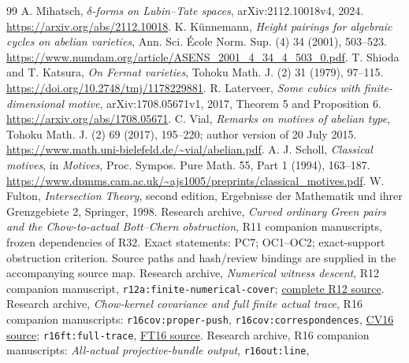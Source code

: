 \documentclass[11pt,a4paper]{article}
\theoremstyle{definition}
\theoremstyle{remark}\newtheorem{remark}[theorem]{Remark}
\numberwithin{equation}{section}
\begin{document}
\begin{thebibliography}{99}
 A. Mihatsch, \emph{$\delta$-forms on Lubin--Tate spaces},
arXiv:2112.10018v4, 2024. \url{https://arxiv.org/abs/2112.10018}.
 K. K\"unnemann, \emph{Height pairings for algebraic cycles on
abelian varieties}, Ann. Sci. \'Ecole Norm. Sup. (4) 34 (2001), 503--523.
\url{https://www.numdam.org/article/ASENS_2001_4_34_4_503_0.pdf}.
 T. Shioda and T. Katsura, \emph{On Fermat varieties},
Tohoku Math. J. (2) 31 (1979), 97--115.
\url{https://doi.org/10.2748/tmj/1178229881}.
 R. Laterveer, \emph{Some cubics with finite-dimensional
motive}, arXiv:1708.05671v1, 2017, Theorem 5 and Proposition 6.
\url{https://arxiv.org/abs/1708.05671}.
 C. Vial, \emph{Remarks on motives of abelian type},
Tohoku Math. J. (2) 69 (2017), 195--220; author version of 20 July 2015.
\url{https://www.math.uni-bielefeld.de/~vial/abelian.pdf}.
 A. J. Scholl, \emph{Classical motives}, in
\emph{Motives}, Proc. Sympos. Pure Math. 55, Part 1 (1994), 163--187.
\url{https://www.dpmms.cam.ac.uk/~ajs1005/preprints/classical_motives.pdf}.
 W. Fulton, \emph{Intersection Theory}, second edition,
Ergebnisse der Mathematik und ihrer Grenzgebiete 2, Springer, 1998.
 Research archive, \emph{Curved ordinary Green
pairs and the Chow-to-actual Bott--Chern obstruction}, R11 companion
manuscripts, frozen dependencies of R32. Exact statements: PC7;
OC1--OC2; exact-support obstruction criterion. Source paths and
hash/review bindings are supplied in the accompanying source map.
 Research archive,
\emph{Numerical witness descent}, R12 companion manuscript,
\texttt{r12a:finite-numerical-cover};
\href{https://openmath-atlas.org/projects/strong-green/editions/v0.5.2/source-files/companion/proofs/foundations/R12_numerical_witness_descent.tex}{complete R12 source}.
 Research archive,
\emph{Chow-kernel covariance and full finite actual trace}, R16 companion
manuscripts: \texttt{r16cov:proper-push}, \texttt{r16cov:correspondences},
\href{https://openmath-atlas.org/projects/strong-green/editions/v0.5.2/source-files/companion/proofs/foundations/R16_proper_covariance_and_rational_domination.tex}{CV16 source};
\texttt{r16ft:full-trace},
\href{https://openmath-atlas.org/projects/strong-green/editions/v0.5.2/source-files/companion/proofs/foundations/R16_full_finite_actual_trace_reconstruction.tex}{FT16 source}.
 Research archive, R16 companion manuscripts:
\emph{All-actual projective-bundle output}, \texttt{r16out:line},

\end{thebibliography}
\end{document}
